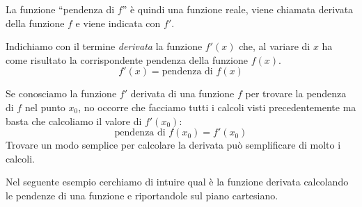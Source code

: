 La funzione ``pendenza di \(f\)'' è quindi una funzione reale, 
viene chiamata derivata della funzione \(f\) 
e viene indicata con \(f'\).


\begin{definizione}
Indichiamo con il termine \emph{derivata} la funzione \(f'(x)\) che, al 
variare di \(x\) ha come risultato la corrispondente pendenza della 
funzione \(f(x)\).
\[f'(x) = \text{pendenza di } f(x)\]
\end{definizione}


Se conosciamo la funzione \(f'\) derivata di una funzione \(f\) per 
trovare la pendenza di \(f\) nel punto \(x_0\), no occorre che facciamo 
tutti i calcoli visti precedentemente ma basta che calcoliamo il valore 
di \(f'(x_0)\): 
\[\text{pendenza di } f(x_0) = f'(x_0)\]
Trovare un modo semplice per calcolare la derivata può semplificare di 
molto i calcoli.

Nel seguente esempio cerchiamo di intuire qual è la funzione derivata 
calcolando le pendenze di una funzione e riportandole sul piano cartesiano.

